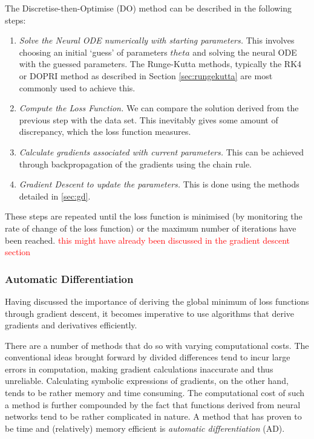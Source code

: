 \documentclass[a4paper,11pt,titlepage]{article}
\def\theta{theta}%
\theoremstyle{definition}
\theoremstyle{plain}
\theoremstyle{remark}
\begin{document}
The Discretise-then-Optimise (DO) method can be described in the following steps:
\begin{enumerate}
    \item \textit{Solve the Neural ODE numerically with starting parameters.} This involves choosing an initial ‘guess’ of parameters $\theta$ and solving the neural ODE with the guessed parameters. The Runge-Kutta methods, typically the RK4 or DOPRI method as described in Section \ref{sec:rungekutta} are most commonly used to achieve this.
    \item \textit{Compute the Loss Function.} We can compare the solution derived from the previous step with the data set. This inevitably gives some amount of discrepancy, which the loss function measures.
    \item \textit{Calculate gradients associated with current parameters.} This can be achieved through backpropagation of the gradients using the chain rule. 
    \item \textit{Gradient Descent to update the parameters.} This is done using the methods detailed in \ref{sec:gd}.
\end{enumerate}

These steps are repeated until the loss function is minimised (by monitoring the rate of change of the loss function) or the maximum number of iterations have been reached. \textcolor{red}{this might have already been discussed in the gradient descent section}

\subsubsection{Automatic Differentiation}
\label{sec:ad}

Having discussed the importance of deriving the global minimum of loss functions through gradient descent, it becomes imperative to use algorithms that derive gradients and derivatives efficiently. 

There are a number of methods that do so with varying computational costs. The conventional ideas brought forward by divided differences tend to incur large errors in computation, making gradient calculations inaccurate and thus unreliable. Calculating symbolic expressions of gradients, on the other hand, tends to be rather memory and time consuming. The computational cost of such a method is further compounded by the fact that functions derived from neural networks tend to be rather complicated in nature. A method that has proven to be time and (relatively) memory efficient is \textit{automatic differentiation} (AD). 
\end{document}
